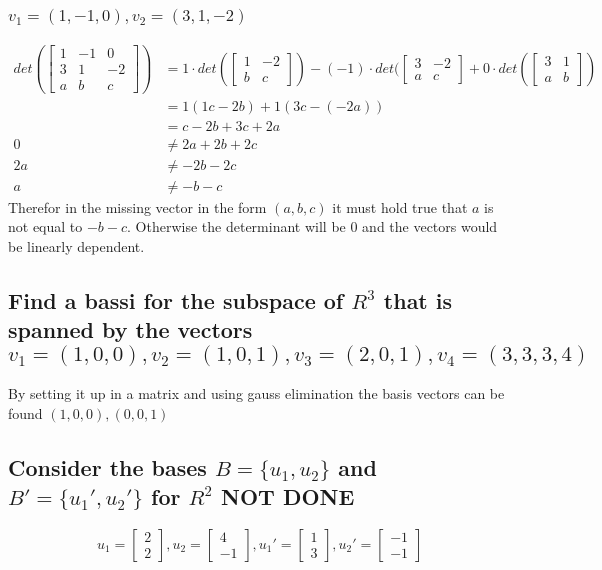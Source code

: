 \documentclass[12pt, a4paper]{article}
\begin{document}
			\subsubsection{$v_1=(1,-1,0),v_2=(3,1,-2)$}
				\begin{align*}
					det(\begin{bmatrix} 1&-1&0\\3&1&-2\\a&b&c\end{bmatrix})&=1\cdot det(\begin{bmatrix}1&-2\\b&c\end{bmatrix})-(-1)\cdot det(\begin{bmatrix}3&-2\\a&c\end{bmatrix}+0\cdot det(\begin{bmatrix}3&1\\a&b\end{bmatrix})\\
					&=1(1c-2b)+1(3c-(-2a))\\
					&=c-2b+3c+2a\\
					0&\neq 2a+2b+2c\\
					2a&\neq -2b-2c\\
					a&\neq -b-c
				\end{align*}
				Therefor in the missing vector in the form $(a,b,c)$ it must hold true that $a$ is not equal to $-b-c$. Otherwise the determinant will be 0 and the vectors would be linearly dependent.
		\subsection{Find a bassi for the subspace of $R^3$ that is spanned by the vectors $v_1=(1,0,0),v_2=(1,0,1),v_3=(2,0,1),v_4=(3,3,3,4)$}
		By setting it up in a matrix and using gauss elimination the basis vectors can be found
			$(1,0,0),(0,0,1)$
		\subsection{Consider the bases $B=\{u_1,u_2\}$ and $B'=\{u_1',u_2'\}$ for $R^2$ NOT DONE}
			$$u_1=\begin{bmatrix}2\\2\end{bmatrix},u_2=\begin{bmatrix}4\\-1\end{bmatrix},u_1'=\begin{bmatrix}1\\3\end{bmatrix},u_2'=\begin{bmatrix}-1\\-1\end{bmatrix}$$
\end{document}
